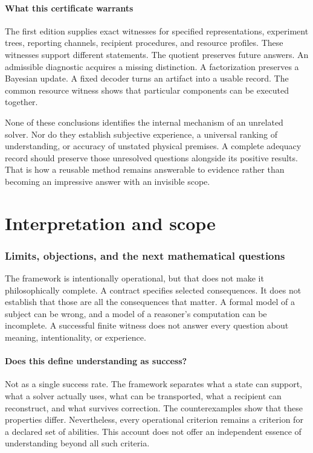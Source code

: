 \documentclass[11pt,letterpaper]{article}
\theoremstyle{plain}
\theoremstyle{definition}
\begin{document}
\subsection{What this certificate warrants}
The first edition supplies exact witnesses for specified representations, experiment trees, reporting channels, recipient procedures, and resource profiles. These witnesses support different statements. The quotient preserves future answers. An admissible diagnostic acquires a missing distinction. A factorization preserves a Bayesian update. A fixed decoder turns an artifact into a usable record. The common resource witness shows that particular components can be executed together.

None of these conclusions identifies the internal mechanism of an unrelated solver. Nor do they establish subjective experience, a universal ranking of understanding, or accuracy of unstated physical premises. A complete adequacy record should preserve those unresolved questions alongside its positive results. That is how a reusable method remains answerable to evidence rather than becoming an impressive answer with an invisible scope.


\clearpage\part{Interpretation and scope}

\section{Limits, objections, and the next mathematical questions}\label{sec:limits}
The framework is intentionally operational, but that does not make it philosophically complete. A contract specifies selected consequences. It does not establish that those are all the consequences that matter. A formal model of a subject can be wrong, and a model of a reasoner's computation can be incomplete. A successful finite witness does not answer every question about meaning, intentionality, or experience.

\subsection{Does this define understanding as success?}
Not as a single success rate. The framework separates what a state can support, what a solver actually uses, what can be transported, what a recipient can reconstruct, and what survives correction. The counterexamples show that these properties differ. Nevertheless, every operational criterion remains a criterion for a declared set of abilities. This account does not offer an independent essence of understanding beyond all such criteria.
\end{document}
